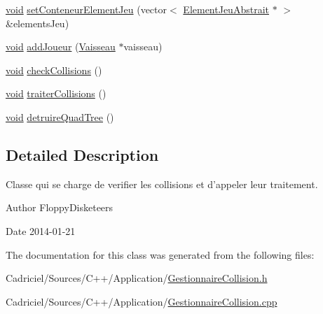 \begin{DoxyCompactItemize}
\hyperlink{wglew_8h_aeea6e3dfae3acf232096f57d2d57f084}{void} \hyperlink{group__inf2990_ga883cc7e90d1ec884d4f983a302c9ed90}{set\-Conteneur\-Element\-Jeu} (vector$<$ \hyperlink{class_element_jeu_abstrait}{Element\-Jeu\-Abstrait} $\ast$ $>$ \&elements\-Jeu)
\item 
\hyperlink{wglew_8h_aeea6e3dfae3acf232096f57d2d57f084}{void} \hyperlink{group__inf2990_ga6b1e1b31aa559c75d0cb6314620aef7b}{add\-Joueur} (\hyperlink{class_vaisseau}{Vaisseau} $\ast$vaisseau)
\item 
\hyperlink{wglew_8h_aeea6e3dfae3acf232096f57d2d57f084}{void} \hyperlink{group__inf2990_ga34d26483935d731acb183b073f0641e4}{check\-Collisions} ()
\item 
\hyperlink{wglew_8h_aeea6e3dfae3acf232096f57d2d57f084}{void} \hyperlink{group__inf2990_gab1e397ffc039f85112a7a177fb0219f3}{traiter\-Collisions} ()
\item 
\hyperlink{wglew_8h_aeea6e3dfae3acf232096f57d2d57f084}{void} \hyperlink{group__inf2990_ga9d33a33cd08ac039ff71c43976397d38}{detruire\-Quad\-Tree} ()
\end{DoxyCompactItemize}


\subsection{Detailed Description}
Classe qui se charge de verifier les collisions et d'appeler leur traitement. 

\begin{DoxyAuthor}{Author}
Floppy\-Disketeers 
\end{DoxyAuthor}
\begin{DoxyDate}{Date}
2014-\/01-\/21 
\end{DoxyDate}


The documentation for this class was generated from the following files\-:\begin{DoxyCompactItemize}
\item 
Cadriciel/\-Sources/\-C++/\-Application/\hyperlink{_gestionnaire_collision_8h}{Gestionnaire\-Collision.\-h}\item 
Cadriciel/\-Sources/\-C++/\-Application/\hyperlink{_gestionnaire_collision_8cpp}{Gestionnaire\-Collision.\-cpp}\end{DoxyCompactItemize}
